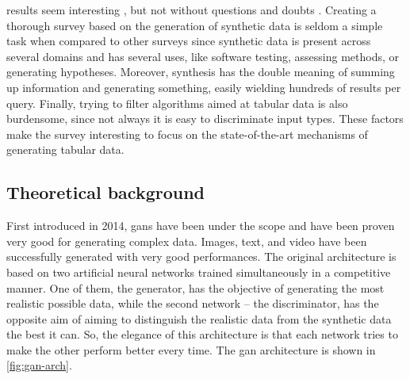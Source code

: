 results seem interesting \cite{goncalves_generation_2020}, but not without questions and doubts
\cite{stadler_synthetic_2020}.
Creating a thorough survey based on the generation of synthetic data is seldom a simple task when compared to other surveys since synthetic data is present across several domains and has several uses, like software testing, assessing methods, or generating hypotheses. Moreover, synthesis has
the double meaning of summing up information and generating something, easily wielding hundreds of results per query. Finally, trying to filter
algorithms aimed at tabular data is also burdensome, since not always it is easy to discriminate input types. These factors make the survey interesting to focus on the state-of-the-art mechanisms of generating tabular data.

\subsection{Theoretical background}
First introduced in 2014, \acp{gan} \cite{goodfellow_generative_2014} have been under the scope and have been proven very good for generating complex data. Images, text, and video have been successfully generated with very good performances. %
The original architecture is based on two artificial neural networks trained simultaneously in a competitive manner. One of them, the generator, has the objective of generating the most realistic possible data, while the second network – the discriminator, has the opposite aim of aiming to distinguish the realistic data from the synthetic
data the best it can. So, the elegance of this architecture is that each network tries to
make the other perform better every time. The \ac{gan} architecture is shown in \ref{fig:gan-arch}.

